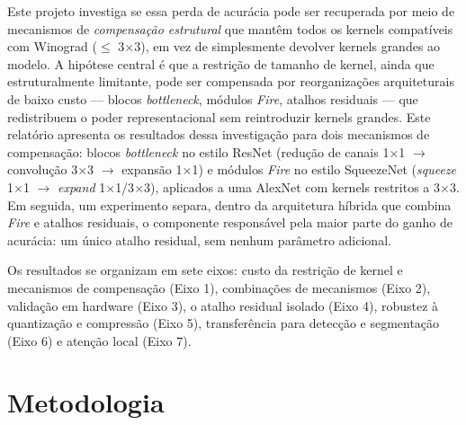 \documentclass[conference]{IEEEtran}
\begin{document}
Este projeto investiga se essa perda de acurácia pode ser recuperada por meio de mecanismos de
\emph{compensação estrutural} que mantêm todos os kernels compatíveis com Winograd ($\leq$
3$\times$3), em vez de simplesmente devolver kernels grandes ao modelo. A hipótese central é que a
restrição de tamanho de kernel, ainda que estruturalmente limitante, pode ser compensada por
reorganizações arquiteturais de baixo custo — blocos \textit{bottleneck}, módulos \textit{Fire},
atalhos residuais — que redistribuem o poder representacional sem reintroduzir kernels grandes. Este relatório apresenta os resultados dessa investigação para dois mecanismos de compensação:
blocos \textit{bottleneck} no estilo ResNet \cite{he2016deep} (redução de canais 1$\times$1
$\rightarrow$ convolução 3$\times$3 $\rightarrow$ expansão 1$\times$1) e módulos \textit{Fire} no
estilo SqueezeNet \cite{iandola2016squeezenet} (\textit{squeeze} 1$\times$1 $\rightarrow$
\textit{expand} 1$\times$1/3$\times$3), aplicados a uma AlexNet com kernels restritos a 3$\times$3.
Em seguida, um experimento separa, dentro da arquitetura híbrida que combina \textit{Fire} e atalhos
residuais, o componente responsável pela maior parte do ganho de acurácia: um único atalho
residual, sem nenhum parâmetro adicional.

Os resultados se organizam em sete eixos: custo da restrição de kernel e mecanismos de compensação
(Eixo 1), combinações de mecanismos (Eixo 2), validação em hardware (Eixo 3), o atalho residual
isolado (Eixo 4), robustez à quantização e compressão (Eixo 5), transferência para detecção e
segmentação (Eixo 6) e atenção local (Eixo 7).

\section{Metodologia}
\end{document}
